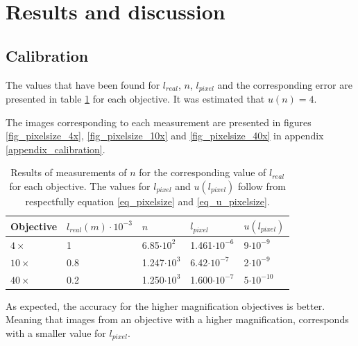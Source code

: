 \section{Results and discussion}

\subsection{Calibration}

The values that have been found for $l_{real}$, $n$, $l_{pixel}$ and the corresponding error are presented in table \ref{table_pixelsize} for each objective. It was estimated that $u(n) = 4$.

The images corresponding to each measurement are presented in figures \ref{fig_pixelsize_4x}, \ref{fig_pixelsize_10x} and \ref{fig_pixelsize_40x} in appendix \ref{appendix_calibration}.

\begin{table}[h!]


\centering
\captionsetup{font=small, justification = centering}
  \caption{Results of measurements of $n$ for the corresponding value of $l_{real}$ for each objective. The values for $l_{pixel}$ and $u(l_{pixel})$ follow from respectfully equation \ref{eq_pixelsize} and \ref{eq_u_pixelsize}.}

\begin{tabular}{|l|l|l|l|l|}
\hline

Objective & $l_{real} (m) \cdot 10^{-3}$ & $n$ & $l_{pixel}$ & $u(l_{pixel})$ \\ \hline
$4\times$ & 1 & 6.85$\cdot 10^2$ & 1.461$\cdot 10^{-6}$ & 9$\cdot 10^{-9}$\\
$10\times$ & 0.8 & 1.247$\cdot 10^3$ & 6.42$\cdot 10^{-7}$ & 2$\cdot 10^{-9}$ \\
$40\times$ & 0.2 & 1.250$\cdot 10^3$ & 1.600$\cdot 10^{-7}$ & 5$\cdot 10^{-10}$ \\ \hline
\end{tabular}

\label{table_pixelsize}
\end{table}

As expected, the accuracy for the higher magnification objectives is better. Meaning that images from an objective with a higher magnification, corresponds with a smaller value for $l_{pixel}$.

\bigskip

